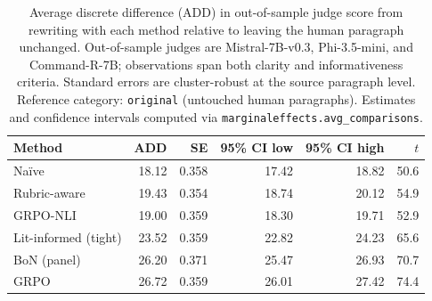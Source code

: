 \begin{table}[h]
  \centering
  \caption{Average discrete difference (ADD) in out-of-sample judge score from rewriting with each method relative to leaving the human paragraph unchanged. Out-of-sample judges are Mistral-7B-v0.3, Phi-3.5-mini, and Command-R-7B; observations span both clarity and informativeness criteria. Standard errors are cluster-robust at the source paragraph level. Reference category: \texttt{original} (untouched human paragraphs). Estimates and confidence intervals computed via \texttt{marginaleffects.avg\_comparisons}.}
  \label{tab:add-method-effects}
  \begin{tabular}{lrrrrr}
    \toprule
    Method & ADD & SE & 95\% CI low & 95\% CI high & $t$ \\
    \midrule
    Na\"ive                &  18.12 & 0.358 &  17.42 &  18.82 &   50.6 \\
    Rubric-aware           &  19.43 & 0.354 &  18.74 &  20.12 &   54.9 \\
    GRPO-NLI               &  19.00 & 0.359 &  18.30 &  19.71 &   52.9 \\
    Lit-informed (tight)   &  23.52 & 0.359 &  22.82 &  24.23 &   65.6 \\
    BoN (panel)            &  26.20 & 0.371 &  25.47 &  26.93 &   70.7 \\
    GRPO                   &  26.72 & 0.359 &  26.01 &  27.42 &   74.4 \\
    \bottomrule
  \end{tabular}
\end{table}
